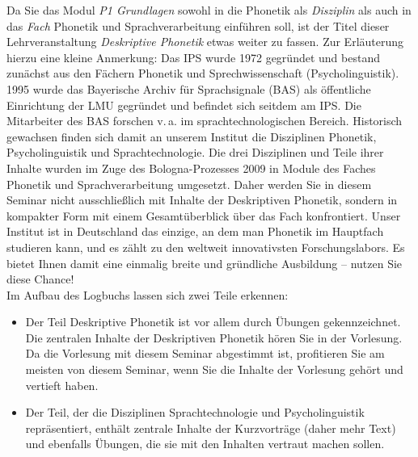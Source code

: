 \documentclass[11pt]{book}
\begin{document}
Da Sie das Modul \textit{P1 Grundlagen} sowohl in die Phonetik als \textit{Disziplin} als auch in das \textit{Fach} Phonetik und Sprachverarbeitung einführen soll, ist der Titel dieser Lehrveranstaltung \emph{Deskriptive Phonetik} etwas weiter zu fassen. Zur Erläuterung hierzu eine kleine Anmerkung: Das IPS wurde 1972 gegründet und bestand zunächst aus den Fächern Phonetik und Sprechwissenschaft (Psycholinguistik). 1995 wurde das Bayerische Archiv für Sprachsignale (BAS) als öffentliche Einrichtung der LMU gegründet und befindet sich seitdem am IPS. Die Mitarbeiter des BAS forschen v.\,a. im sprachtechnologischen Bereich. Historisch gewachsen finden sich damit an unserem Institut die Disziplinen Phonetik, Psycholinguistik und Sprachtechnologie.  Die drei Disziplinen und Teile ihrer Inhalte wurden im Zuge des Bologna-Prozesses 2009 in Module des Faches Phonetik und Sprachverarbeitung umgesetzt. Daher werden Sie in diesem Seminar nicht ausschließlich mit Inhalte der Deskriptiven Phonetik, sondern in kompakter Form mit einem Gesamtüberblick über das Fach konfrontiert. Unser Institut ist in Deutschland das einzige, an dem man Phonetik im Hauptfach studieren kann, und es zählt zu den weltweit innovativsten Forschungslabors. Es bietet Ihnen damit eine einmalig breite und gründliche Ausbildung – nutzen Sie diese Chance!\\

Im Aufbau des Logbuchs lassen sich zwei Teile erkennen:
\begin{itemize}
      \item Der Teil Deskriptive Phonetik ist vor allem durch Übungen gekennzeichnet. Die zentralen Inhalte der Deskriptiven Phonetik hören Sie in der Vorlesung. Da die Vorlesung mit diesem Seminar abgestimmt ist, profitieren Sie am meisten von diesem Seminar, wenn Sie die Inhalte der Vorlesung gehört und vertieft haben.
      
      \item Der Teil, der die Disziplinen Sprachtechnologie und Psycholinguistik repräsentiert, enthält zentrale Inhalte der Kurzvorträge (daher mehr Text) und ebenfalls Übungen, die sie mit den Inhalten vertraut machen sollen.
   \end{itemize}
\end{document}
